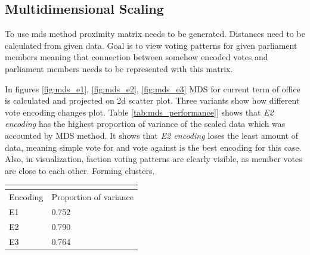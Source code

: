 \documentclass[a4paper,12pt]{article}
\begin{document}
	\clearpage
	
	\subsection{Multidimensional Scaling}
	
	To use \acrshort{mds} method proximity matrix needs to be generated. Distances need to be calculated from given data. Goal is to view voting patterns for given parliament members meaning that connection between somehow encoded votes and parliament members needs to be represented with this matrix.
	
	In figures \ref{fig:mds_e1}, \ref{fig:mds_e2}, \ref{fig:mds_e3} MDS for current term of office is calculated and projected on 2d scatter plot. Three variants show how different vote encoding changes plot. Table \ref{tab:mds_performance]} shows that \textit{E2 encoding} has the highest proportion of variance of the scaled data which was accounted by MDS method. It shows that \textit{E2 encoding} loses the least amount of data, meaning simple vote for and vote against is the best encoding for this case. Also, in visualization, faction voting patterns are clearly visible, as member votes are close to each other. Forming clusters.
	
	\noindent
	\begin{center}
		\begin{tabular}{L{2cm} C{4cm}}
			\\ 
			\hline
			Encoding & Proportion of variance \\\hline
			E1 & 0.752 \\
			E2 & 0.790 \\
			E3 & 0.764 \\
			\hline
		\end{tabular}
		 \label{tab:mds_performance]}
	\end{center} 
	
\end{document}
